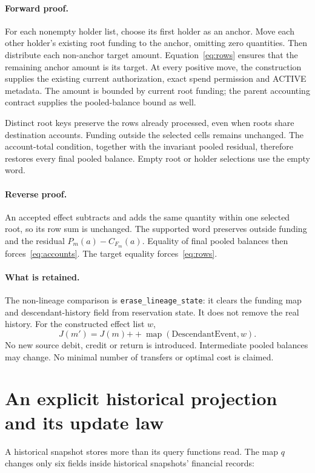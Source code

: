 \documentclass[10pt,a4paper]{article}
\newcommand{\code}[1]{\nolinkurl{#1}}
\newcommand{\cat}{\mathbin{+\!+}}
\begin{document}
\paragraph{Forward proof.}
For each nonempty holder list, choose its first holder as an anchor. Move each
other holder's existing root funding to the anchor, omitting zero quantities.
Then distribute each non-anchor target amount. Equation~\eqref{eq:rows}
ensures that the remaining anchor amount is its target. At every positive move,
the construction supplies the existing current authorization, exact spend
permission and ACTIVE metadata. The amount is bounded by current root funding;
the parent accounting contract supplies the pooled-balance bound as well.

Distinct root keys preserve the rows already processed, even when roots share
destination accounts. Funding outside the selected cells remains unchanged.
The account-total condition, together with the invariant pooled residual,
therefore restores every final pooled balance. Empty root or holder selections
use the empty word.

\paragraph{Reverse proof.}
An accepted effect subtracts and adds the same quantity within one selected
root, so its row sum is unchanged. The supported word preserves outside
funding and the residual $P_m(a)-C_{F_m}(a)$. Equality of final pooled balances
then forces~\eqref{eq:accounts}. The target equality forces~\eqref{eq:rows}.

\paragraph{What is retained.}
The non-lineage comparison is \code{erase_lineage_state}: it clears the funding
map and descendant-history field from reservation state. It does not remove
the real history. For the constructed effect list $w$,
\[
 J(m')=J(m)\cat\operatorname{map}(\mathrm{DescendantEvent},w).
\]
No new source debit, credit or return is introduced. Intermediate pooled
balances may change. No minimal number of transfers or optimal cost is claimed.

\clearpage
\section{An explicit historical projection and its update law}
A historical snapshot stores more than its query functions read. The map
$q$ changes only six fields inside historical snapshots' financial records:
\end{document}
